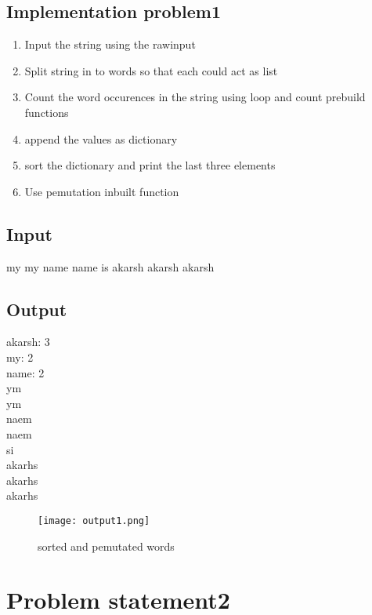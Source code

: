 \documentclass[12pt]{article}
\begin{document}
{{

\subsection{Implementation problem1}
\begin{enumerate}
\item{Input the string using the rawinput}
\item{Split string in to words so that each could act as list }
\item{Count the word occurences in the string using loop and count prebuild functions}
\item{append the values as dictionary  }
\item{sort the dictionary and print the last three elements}
\item{Use pemutation inbuilt function}

\end{enumerate}
 \newpage
\subsection{Input}   %
my my name name is akarsh akarsh akarsh 


\subsection{Output}
akarsh: 3\\
my: 2\\
name: 2\\
ym\\
ym\\
naem\\
naem\\
si\\
akarhs\\
akarhs\\
akarhs\\

 
\begin{figure}[H]
{
 \centering
\texttt{[image: output1.png]}
\caption{sorted and pemutated words}
\vspace{2cm}

}
\end{figure}



\newpage
\section{Problem statement2} %

}}
\end{document}
